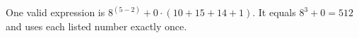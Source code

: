 One valid expression is $\boxed{8^{(5-2)}+0\cdot(10+15+14+1)}$. It equals $8^3+0=512$ and uses each listed number exactly once.
